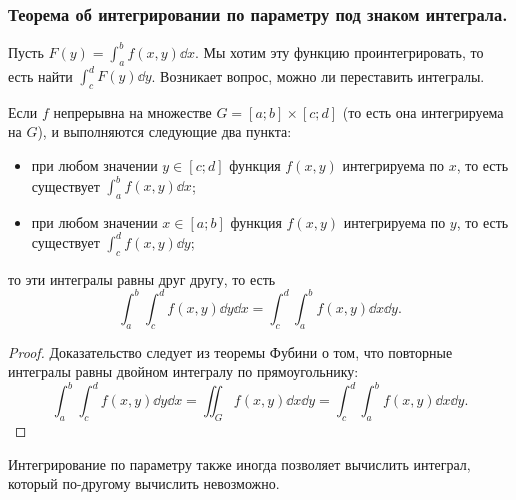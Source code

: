 \subsubsection{Теорема об интегрировании по параметру под знаком интеграла.}

Пусть $F(y) = \int_a^b f(x, y) \dd x$. Мы хотим эту функцию проинтегрировать, то есть найти $\int_c^d F(y) \dd y$. Возникает вопрос, можно ли переставить интегралы.

\begin{theorem*}
    Если $f$ непрерывна на множестве $G = [a; b] \times [c; d]$ (то есть она интегрируема на $G$), и выполняются следующие два пункта:
    \begin{itemize}
    \item 
        при любом значении $y \in [c; d]$ функция $f(x, y)$ интегрируема по $x$, то есть существует $\int_a^b f(x, y) \dd x$;

    \item 
        при любом значении $x \in [a; b]$ функция $f(x, y)$ интегрируема по $y$, то есть существует $\int_c^d f(x, y) \dd y$;
    \end{itemize}

    то эти интегралы равны друг другу, то есть
    \begin{equation*}
        \int_a^b \int_c^d f(x, y) \dd y \dd x
        = \int_c^d \int_a^b f(x, y) \dd x \dd y.
    \end{equation*}
\end{theorem*}

\begin{proof}
    Доказательство следует из теоремы Фубини о том, что повторные интегралы равны двойном интегралу по прямоугольнику:
    \begin{equation*}
        \int_a^b \int_c^d f(x, y) \dd y \dd x
        = \iint_G f(x, y) \dd x \dd y
        = \int_c^d \int_a^b f(x, y) \dd x \dd y.
    \end{equation*}
\end{proof}

Интегрирование по параметру также иногда позволяет вычислить интеграл, который по-другому вычислить невозможно.
